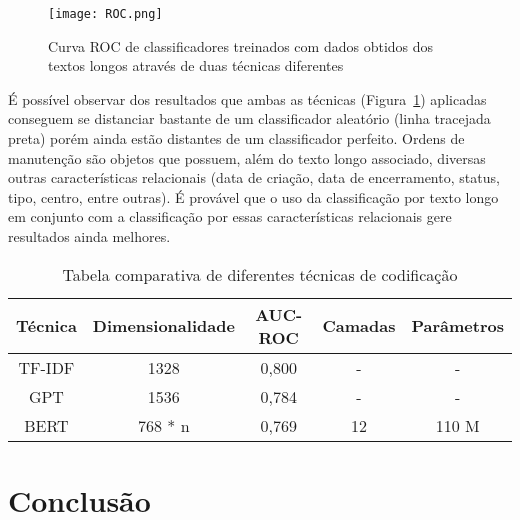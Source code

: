 \documentclass[conference]{IEEEtran}
\begin{document}
  \begin{figure}[ht]
  \centering
  \texttt{[image: ROC.png]}
  \caption{Curva ROC de classificadores treinados com dados obtidos dos textos longos através de duas técnicas diferentes}
  \label{fig:ROC}
  \end{figure}

    É possível observar dos resultados que ambas as técnicas (Figura~\ref{fig:ROC}) aplicadas conseguem se distanciar bastante de um classificador aleatório (linha tracejada preta) porém ainda estão distantes de um classificador perfeito. Ordens de manutenção são objetos que possuem, além do texto longo associado, diversas outras características relacionais (data de criação, data de encerramento, status, tipo, centro, entre outras). É provável que o uso da classificação por texto longo em conjunto com a classificação por essas características relacionais gere resultados ainda melhores.
    
    \begin{table}
    \sffamily
    \footnotesize
        \centering
\caption{Tabela comparativa de diferentes técnicas de codificação}
\label{tab:my_label}
        \def\arraystretch{2}
        \begin{tabular}{|c|c|c|c|c|} \hline 
             Técnica&  Dimensionalidade&  AUC-ROC & Camadas&Parâmetros\\ \hline 
             TF-IDF&  1328&  0,800 & -&-\\ \hline 
             GPT&  1536&  0,784 & -&-\\ \hline
 BERT& 768 * n&0,769 & 12&110 M\\\hline
        \end{tabular}
        
    \end{table}
  
\section{Conclusão}
\end{document}
